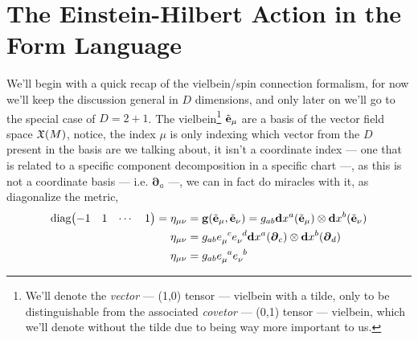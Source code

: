 \section{The Einstein-Hilbert Action in the Form Language}

We'll begin with a quick recap of the vielbein/spin connection formalism, for now we'll keep the discussion general in $D$ dimensions, and 
only later on we'll go to the special case of $D=2+1$. The vielbein\footnote{We'll denote the \textit{vector} --- (1,0) tensor --- vielbein with a tilde, only to be distinguishable from the 
associated \textit{covetor} --- (0,1) tensor --- vielbein, which we'll denote without the tilde due to being way more important to us.} $\tilde{\vb e}_\mu$ are a basis of the vector field space $\mathfrak X\qty(M)$, notice, 
the index $\mu$ is only indexing which vector from the $D$ present in the basis are we talking about, it isn't a coordinate index --- one that is 
related to a specific component decomposition in a specific chart ---, as this is not a coordinate basis --- i.e. $\boldsymbol\partial_a$ ---, we can 
in fact do miracles with it, as diagonalize the metric,
\begin{align*}
    \textnormal{diag}\mqty(-1& 1&\cdots&1)=\eta_{\mu\nu}&=\vb g\qty(\tilde{\vb e}_\mu,\tilde{\vb e}_\nu)=g_{ab}\vb d{x^a}\qty(\tilde{\vb e}_\mu)\otimes\vb d{x^b}\qty(\tilde{\vb e}_\nu)\\
    \eta_{\mu\nu}&=g_{ab}\tensor{e}{_\mu^c}\tensor{e}{_\nu^d}\vb d{x^a}\qty(\boldsymbol\partial_c)\otimes\vb d{x^b}\qty(\boldsymbol\partial_d)\\
    \eta_{\mu\nu}&=g_{ab}\tensor{e}{_\mu^a}\tensor{e}{_\nu^b}
\end{align*}

